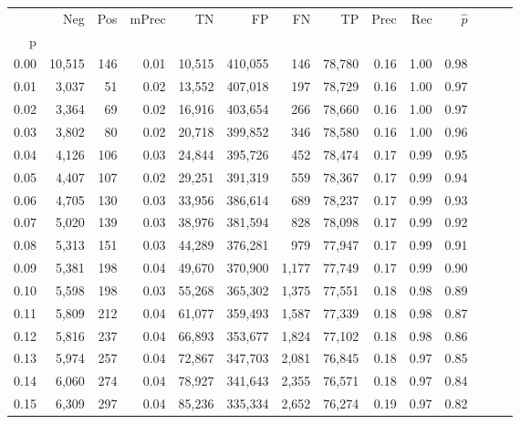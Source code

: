 \begin{tabular}{rrrrrrrrrrrrrr}
\toprule
{} &     Neg &    Pos & mPrec &       TN &       FP &      FN &      TP &  Prec &   Rec & $\hat{p}$ \\
p    &         &        &       &          &          &         &         &       &       &           \\
\midrule
0.00 &  10,515 &    146 &  0.01 &   10,515 &  410,055 &     146 &  78,780 &  0.16 &  1.00 &      0.98 \\
0.01 &   3,037 &     51 &  0.02 &   13,552 &  407,018 &     197 &  78,729 &  0.16 &  1.00 &      0.97 \\
0.02 &   3,364 &     69 &  0.02 &   16,916 &  403,654 &     266 &  78,660 &  0.16 &  1.00 &      0.97 \\
0.03 &   3,802 &     80 &  0.02 &   20,718 &  399,852 &     346 &  78,580 &  0.16 &  1.00 &      0.96 \\
0.04 &   4,126 &    106 &  0.03 &   24,844 &  395,726 &     452 &  78,474 &  0.17 &  0.99 &      0.95 \\
0.05 &   4,407 &    107 &  0.02 &   29,251 &  391,319 &     559 &  78,367 &  0.17 &  0.99 &      0.94 \\
0.06 &   4,705 &    130 &  0.03 &   33,956 &  386,614 &     689 &  78,237 &  0.17 &  0.99 &      0.93 \\
0.07 &   5,020 &    139 &  0.03 &   38,976 &  381,594 &     828 &  78,098 &  0.17 &  0.99 &      0.92 \\
0.08 &   5,313 &    151 &  0.03 &   44,289 &  376,281 &     979 &  77,947 &  0.17 &  0.99 &      0.91 \\
0.09 &   5,381 &    198 &  0.04 &   49,670 &  370,900 &   1,177 &  77,749 &  0.17 &  0.99 &      0.90 \\
0.10 &   5,598 &    198 &  0.03 &   55,268 &  365,302 &   1,375 &  77,551 &  0.18 &  0.98 &      0.89 \\
0.11 &   5,809 &    212 &  0.04 &   61,077 &  359,493 &   1,587 &  77,339 &  0.18 &  0.98 &      0.87 \\
0.12 &   5,816 &    237 &  0.04 &   66,893 &  353,677 &   1,824 &  77,102 &  0.18 &  0.98 &      0.86 \\
0.13 &   5,974 &    257 &  0.04 &   72,867 &  347,703 &   2,081 &  76,845 &  0.18 &  0.97 &      0.85 \\
0.14 &   6,060 &    274 &  0.04 &   78,927 &  341,643 &   2,355 &  76,571 &  0.18 &  0.97 &      0.84 \\
0.15 &   6,309 &    297 &  0.04 &   85,236 &  335,334 &   2,652 &  76,274 &  0.19 &  0.97 &      0.82 \\

\end{tabular}
